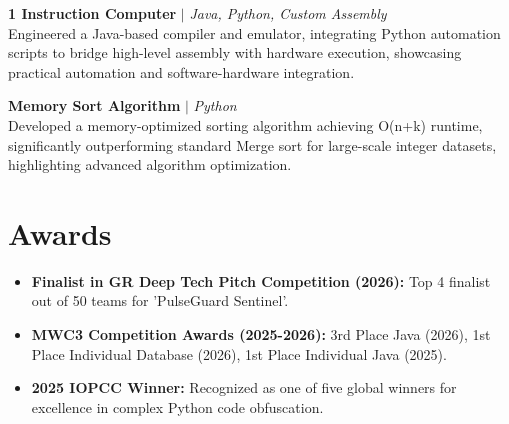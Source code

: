 \documentclass[10pt,letterpaper]{article}
\begin{document}
\textbf{1 Instruction Computer} $|$ \textit{Java, Python, Custom Assembly} \\
Engineered a Java-based compiler and emulator, integrating Python automation scripts to bridge high-level assembly with hardware execution, showcasing practical automation and software-hardware integration.

\textbf{Memory Sort Algorithm} $|$ \textit{Python} \\
Developed a memory-optimized sorting algorithm achieving O(n+k) runtime, significantly outperforming standard Merge sort for large-scale integer datasets, highlighting advanced algorithm optimization.

\section{Awards}
\begin{itemize}
    \item \textbf{Finalist in GR Deep Tech Pitch Competition (2026):} Top 4 finalist out of 50 teams for 'PulseGuard Sentinel'.
    \item \textbf{MWC3 Competition Awards (2025-2026):} 3rd Place Java (2026), 1st Place Individual Database (2026), 1st Place Individual Java (2025).
    \item \textbf{2025 IOPCC Winner:} Recognized as one of five global winners for excellence in complex Python code obfuscation.
\end{itemize}
\end{document}

